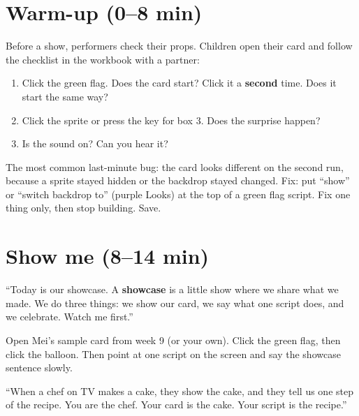 \section{Warm-up (0--8 min)}
\begin{bughunt}
Before a show, performers check their props. Children open their card and follow the checklist in the workbook with a partner:
\begin{enumerate}[leftmargin=1.4em,itemsep=1pt]
  \item Click the green flag. Does the card start? Click it a \textbf{second} time. Does it start the same way?
  \item Click the sprite or press the key for box 3. Does the surprise happen?
  \item Is the sound on? Can you hear it?
\end{enumerate}
The most common last-minute bug: the card looks different on the second run, because a sprite stayed hidden or the backdrop stayed changed. Fix: put \enquote{show} or \enquote{switch backdrop to} (purple Looks) at the top of a green flag script. Fix one thing only, then stop building. Save.
\end{bughunt}

\section{Show me (8--14 min)}
\begin{teacherscript}
\enquote{Today is our showcase. A \textbf{showcase} is a little show where we share what we made. We do three things: we show our card, we say what one script does, and we celebrate. Watch me first.}

Open Mei's sample card from week 9 (or your own). Click the green flag, then click the balloon. Then point at one script on the screen and say the showcase sentence slowly.
\end{teacherscript}

\begin{analogy}
\enquote{When a chef on TV makes a cake, they show the cake, and they tell us one step of the recipe. You are the chef. Your card is the cake. Your script is the recipe.}
\end{analogy}

